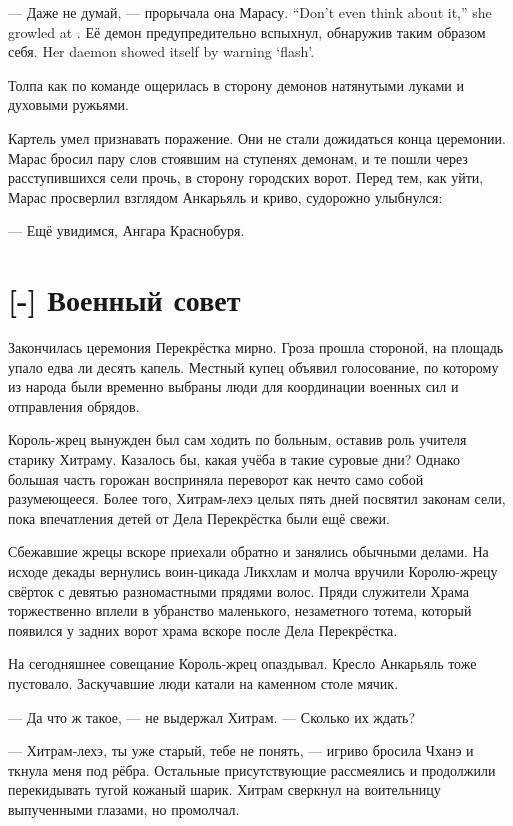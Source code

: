 {--- Даже не думай, --- прорычала она Марасу.}
{``Don't even think about it,'' she growled at \Maaras.}
{Её демон предупредительно вспыхнул, обнаружив таким образом себя.}
{Her daemon showed itself by warning `flash'.}

Толпа как по команде ощерилась в сторону демонов натянутыми луками и духовыми ружьями.

Картель умел признавать поражение.
Они не стали дожидаться конца церемонии.
Марас бросил пару слов стоявшим на ступенях демонам, и те пошли через расступившихся сели прочь, в сторону городских ворот.
Перед тем, как уйти, Марас просверлил взглядом Анкарьяль и криво, судорожно улыбнулся:

--- Ещё увидимся, Ангара Краснобуря.

\section{[-] Военный совет}

Закончилась церемония Перекрёстка мирно.
Гроза прошла стороной, на площадь упало едва ли десять капель.
Местный купец объявил голосование, по которому из народа были временно выбраны люди для координации военных сил и отправления обрядов.

Король-жрец вынужден был сам ходить по больным, оставив роль учителя старику Хитраму.
Казалось бы, какая учёба в такие суровые дни?
Однако большая часть горожан восприняла переворот как нечто само собой разумеющееся.
Более того, Хитрам-лехэ целых пять дней посвятил законам сели, пока впечатления детей от Дела Перекрёстка были ещё свежи.

Сбежавшие жрецы вскоре приехали обратно и занялись обычными делами.
На исходе декады вернулись воин-цикада Ликхлам и молча вручили Королю-жрецу свёрток с девятью разномастными прядями волос.
Пряди служители Храма торжественно вплели в убранство маленького, незаметного тотема, который появился у задних ворот храма вскоре после Дела Перекрёстка.

На сегодняшнее совещание Король-жрец опаздывал.
Кресло Анкарьяль тоже пустовало.
Заскучавшие люди катали на каменном столе мячик.

--- Да что ж такое, --- не выдержал Хитрам.
--- Сколько их ждать?

--- Хитрам-лехэ, ты уже старый, тебе не понять, --- игриво бросила Чханэ и ткнула меня под рёбра.
Остальные присутствующие рассмеялись и продолжили перекидывать тугой кожаный шарик.
Хитрам сверкнул на воительницу выпученными глазами, но промолчал.

